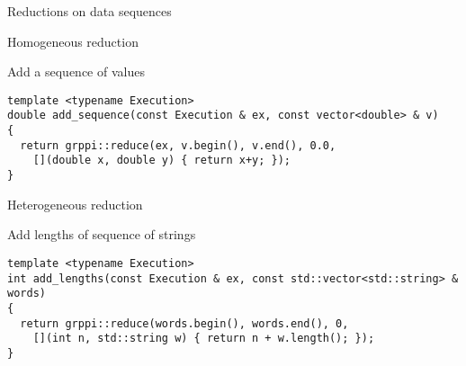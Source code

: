 \begin{frame}[t]{Reductions on data sequences}
\begin{itemize}
\end{itemize}
\end{frame}

\begin{frame}[t,fragile]{Homogeneous reduction}
\begin{block}{Add a sequence of values}
\begin{lstlisting}
template <typename Execution>
double add_sequence(const Execution & ex, const vector<double> & v)
{
  return grppi::reduce(ex, v.begin(), v.end(), 0.0,
    [](double x, double y) { return x+y; });
}
\end{lstlisting}
\end{block}
\end{frame}

\begin{frame}[t,fragile]{Heterogeneous reduction}
\begin{block}{Add lengths of sequence of strings}
\begin{lstlisting}
template <typename Execution>
int add_lengths(const Execution & ex, const std::vector<std::string> & words)
{
  return grppi::reduce(words.begin(), words.end(), 0,
    [](int n, std::string w) { return n + w.length(); });
}
\end{lstlisting}
\end{block}
\end{frame}
